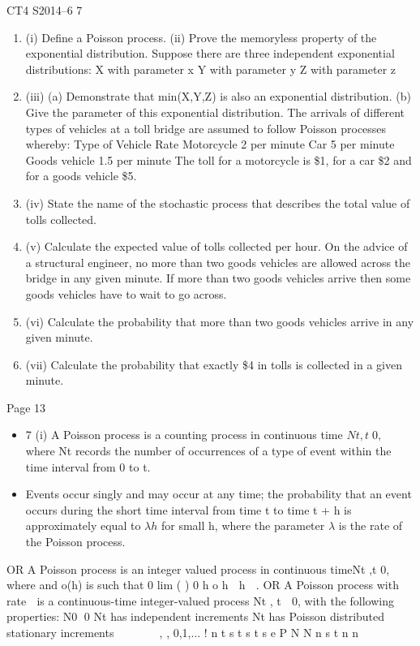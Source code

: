 \documentclass[a4paper,12pt]{article}
\begin{document}
CT4 S2014–6
7 
\begin{enumerate}
    \item (i) Define a Poisson process. 
\ite (ii) Prove the memoryless property of the exponential distribution. 
Suppose there are three independent exponential distributions:
  X with parameter x
Y with parameter y
Z with parameter z
\item (iii) (a) Demonstrate that min(X,Y,Z) is also an exponential distribution.
(b) Give the parameter of this exponential distribution. 
The arrivals of different types of vehicles at a toll bridge are assumed to follow
Poisson processes whereby:
  Type of Vehicle Rate
Motorcycle 2 per minute
Car 5 per minute
Goods vehicle 1.5 per minute
The toll for a motorcycle is \$1, for a car \$2 and for a goods vehicle \$5.
\item (iv) State the name of the stochastic process that describes the total value of tolls
collected. 
\item (v) Calculate the expected value of tolls collected per hour. 
On the advice of a structural engineer, no more than two goods vehicles are allowed
across the bridge in any given minute. If more than two goods vehicles arrive then
some goods vehicles have to wait to go across.
\item (vi) Calculate the probability that more than two goods vehicles arrive in any given
minute. 
\item (vii) Calculate the probability that exactly \$4 in tolls is collected in a given minute.
\end{enumerate}
\newpage
Page 13
\begin{itemize}
    \item 7 (i) A Poisson process is a counting process in continuous time ${Nt ,t 0},$ where
Nt records the number of occurrences of a type of event within the time
interval from 0 to t.
  \item Events occur singly and may occur at any time;
the probability that an event occurs during the short time interval from time t
to time t + h is approximately equal to $\lambda h$ for small h, where the parameter $\lambda$  is
the rate of the Poisson process.
\end{itemize}

OR
A Poisson process is an integer valued process in continuous time{Nt ,t 0},
where
and o(h) is such that
0
lim ( ) 0
h
o h
 h
 .
OR
A Poisson process with rate  is a continuous-time integer-valued process
Nt , t  0, with the following properties:
  N0 0
Nt has independent increments
Nt has Poisson distributed stationary increments
     
, , 0,1,...
!
  n t s
t s
t s e
P N N n s t n
n
            
\end{document}
